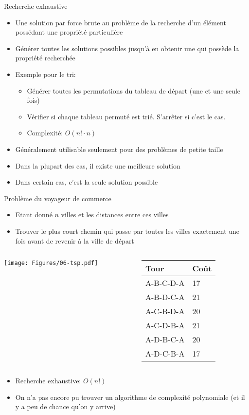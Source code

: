\begin{frame}{Recherche exhaustive}
\begin{itemize}
\item Une solution par force brute au problème de la recherche d'un élément possédant une propriété particulière
\item Générer toutes les solutions possibles jusqu'à en obtenir une qui possède la propriété recherchée
\item Exemple pour le tri:
\begin{itemize}
\item Générer toutes les permutations du tableau de départ (une et une seule fois)
\item Vérifier si chaque tableau permuté est trié. S'arrêter si c'est le cas.
\item Complexité: $O(n!\cdot n)$
\end{itemize}
\item Généralement utilisable seulement pour des problèmes de petite taille
\item Dans la plupart des cas, il existe une meilleure solution
\item Dans certain cas, c'est la seule solution possible
\end{itemize}
\end{frame}

\begin{frame}{Problème du voyageur de commerce}
\begin{itemize}
\item Etant donné $n$ villes et les distances entre ces villes
\item Trouver le plus court chemin qui passe par toutes les villes
  exactement une fois avant de revenir à la ville de départ
\end{itemize}
\begin{columns}
\begin{column}{5cm}
\centerline{\texttt{[image: Figures/06-tsp.pdf]}}
\end{column}
\begin{column}{5cm}
\footnotesize
\begin{tabular}{ll}
Tour & Coût\\
\hline
A-B-C-D-A & 17\\
A-B-D-C-A & 21\\
A-C-B-D-A & 20\\
A-C-D-B-A & 21\\
A-D-B-C-A & 20\\
A-D-C-B-A & 17\\
\end{tabular}
\end{column}
\end{columns}

\begin{itemize}
\item Recherche exhaustive: $O(n!)$
\item On n'a pas encore pu trouver un algorithme de complexité polynomiale (et il y a peu de chance qu'on y arrive)
\end{itemize}

\end{frame}

